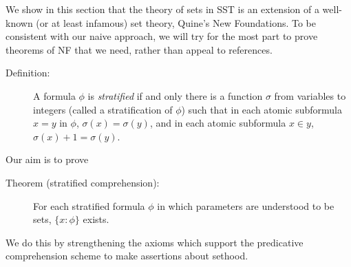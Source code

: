 \documentclass[12pt]{article}
\begin{document}
We show in this section that the theory of sets in SST is an extension of a well-known (or at least infamous) set theory, Quine's New Foundations.  To be consistent with our naive approach,
we will try for the most part to prove theorems of NF that we need, rather than appeal to references.

\begin{description}

\item[Definition:]  A formula $\phi$ is {\em stratified\/} if and only there is a function $\sigma$ from variables to integers (called a stratification of $\phi$) such
that in each atomic subformula $x=y$ in $\phi$, $\sigma(x) = \sigma(y)$, and in each atomic subformula $x \in y$, $\sigma(x) +1 = \sigma(y)$.

\end{description}

Our aim is to prove

\begin{description}

\item[Theorem (stratified comprehension):]  For each stratified formula $\phi$ in which parameters are understood to be sets, $\{x:\phi\}$ exists.

\end{description}

We do this by strengthening the axioms which support the predicative comprehension scheme to make assertions about sethood.
\end{document}
